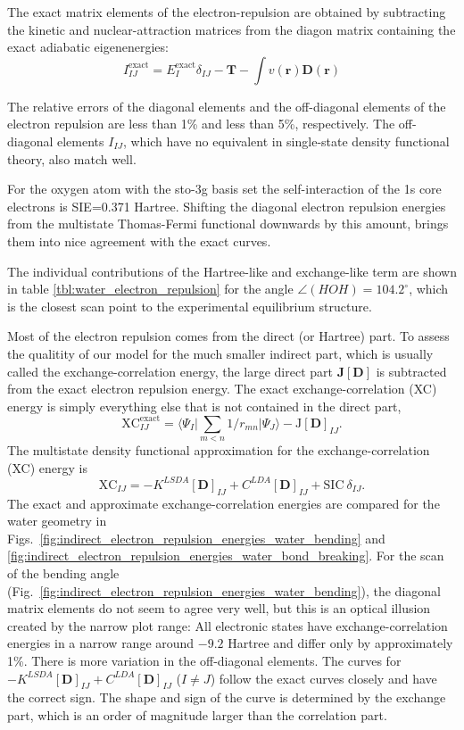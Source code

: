 \documentclass[journal=jacsat,manuscript=article]{achemso}
\newcommand\m[1]{\mathbf{#1}}
\renewcommand\vec[1]{\mathbf{#1}}
\begin{document}
The exact matrix elements of the electron-repulsion are obtained by subtracting the kinetic and nuclear-attraction
matrices from the diagon matrix containing the exact adiabatic eigenenergies:
\begin{equation}
 I^{\text{exact}}_{IJ} = E^{\text{exact}}_{I} \delta_{IJ} - \m{T} - \int v(\vec{r}) \m{D}(\vec{r})
\end{equation}

The relative errors of the diagonal elements and the off-diagonal elements of the electron repulsion
are less than 1\% and less than 5\%, respectively.
The off-diagonal elements $I_{IJ}$, which have no equivalent
in single-state density functional theory, also match well.

For the oxygen atom with the sto-3g basis set the self-interaction of the 1s core electrons is SIE=0.371 Hartree.
Shifting the diagonal electron repulsion energies from the multistate Thomas-Fermi functional
downwards by this amount, brings them into nice agreement with the exact curves.

The individual contributions of the Hartree-like and exchange-like term are shown in table \ref{tbl:water_electron_repulsion} for the angle
$\angle(HOH) = 104.2^{\circ}$, which is the closest scan point to the experimental equilibrium structure.



Most of the electron repulsion comes from the direct (or Hartree) part. To assess the qualitity of
our model for the much smaller indirect part, which is usually called the exchange-correlation energy,
the large direct part $\m{J}[\m{D}]$ is subtracted from the exact electron repulsion energy.
The exact exchange-correlation (XC) energy is simply everything else that is not contained in
the direct part,
\begin{equation}
\text{XC}^{\text{exact}}_{IJ} =
\langle \Psi_I \vert \sum_{m < n} 1/r_{mn} \vert \Psi_J \rangle - \text{J}[\mathbf{D}]_{IJ}.
\end{equation}
The multistate density functional approximation for the exchange-correlation (XC) energy is
\begin{equation}
\text{XC}_{IJ} =  -K^{LSDA}[\mathbf{D}]_{IJ} + C^{LDA}[\mathbf{D}]_{IJ} + \text{SIC}~\delta_{IJ}.
\end{equation}
The exact and approximate exchange-correlation energies are compared for the water geometry
in Figs.~\ref{fig:indirect_electron_repulsion_energies_water_bending} and \ref{fig:indirect_electron_repulsion_energies_water_bond_breaking}.
For the scan of the bending angle (Fig.~\ref{fig:indirect_electron_repulsion_energies_water_bending}),
the diagonal matrix elements do not seem to agree very well, but this is an optical illusion created by the narrow plot range:
All electronic states have exchange-correlation energies in a narrow range around $-9.2$ Hartree and differ only by approximately 1\%. 
There is more variation in the off-diagonal elements. The curves for $-K^{LSDA}[\mathbf{D}]_{IJ} + C^{LDA}[\mathbf{D}]_{IJ}$ ($I \neq J$)
follow the exact curves closely and have the correct sign. The shape and sign of the curve is determined by the exchange part,
which is an order of magnitude larger than the correlation part.
\end{document}

